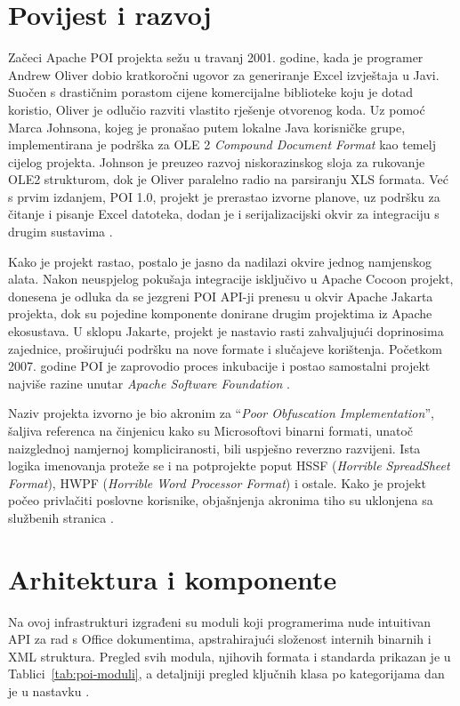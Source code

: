 \documentclass[]{foi}
\begin{document}
\section{Povijest i razvoj}

Začeci Apache POI projekta sežu u travanj 2001. godine, kada je programer Andrew Oliver dobio kratkoročni ugovor za generiranje Excel izvještaja u Javi. Suočen s drastičnim porastom cijene komercijalne biblioteke koju je dotad koristio, Oliver je odlučio razviti vlastito rješenje otvorenog koda. Uz pomoć Marca Johnsona, kojeg je pronašao putem lokalne Java korisničke grupe, implementirana je podrška za OLE 2 \textit{Compound Document Format} kao temelj cijelog projekta. Johnson je preuzeo razvoj niskorazinskog sloja za rukovanje OLE2 strukturom, dok je Oliver paralelno radio na parsiranju XLS formata. Već s prvim izdanjem, POI 1.0, projekt je prerastao izvorne planove, uz podršku za čitanje i pisanje Excel datoteka, dodan je i serijalizacijski okvir za integraciju s drugim sustavima \cite{apacheApachePOIHistory}.

Kako je projekt rastao, postalo je jasno da nadilazi okvire jednog namjenskog alata. Nakon neuspjelog pokušaja integracije isključivo u Apache Cocoon projekt, donesena je odluka da se jezgreni POI API-ji prenesu u okvir Apache Jakarta projekta, dok su pojedine komponente donirane drugim projektima iz Apache ekosustava. U sklopu Jakarte, projekt je nastavio rasti zahvaljujući doprinosima zajednice, proširujući podršku na nove formate i slučajeve korištenja. Početkom 2007. godine POI je zaprovodio proces inkubacije i postao samostalni projekt najviše razine unutar \textit{Apache Software Foundation} \cite{apacheApachePOIHistory}.

Naziv projekta izvorno je bio akronim za ``\textit{Poor Obfuscation Implementation}'', šaljiva referenca na činjenicu kako su Microsoftovi binarni formati, unatoč naizglednoj namjernoj kompliciranosti, bili uspješno reverzno razvijeni. Ista logika imenovanja proteže se i na potprojekte poput HSSF (\textit{Horrible SpreadSheet Format}), HWPF (\textit{Horrible Word Processor Format}) i ostale. Kako je projekt počeo privlačiti poslovne korisnike, objašnjenja akronima tiho su uklonjena sa službenih stranica \cite{wikipediaApacheWikipedia}.

\section{Arhitektura i komponente}

Na ovoj infrastrukturi izgrađeni su moduli koji programerima nude intuitivan API za rad s Office dokumentima, apstrahirajući složenost internih binarnih i XML struktura. Pregled svih modula, njihovih formata i standarda prikazan je u Tablici~\ref{tab:poi-moduli}, a detaljniji pregled ključnih klasa po kategorijama dan je u nastavku \cite{apacheApachePOIComponents}.
\end{document}
